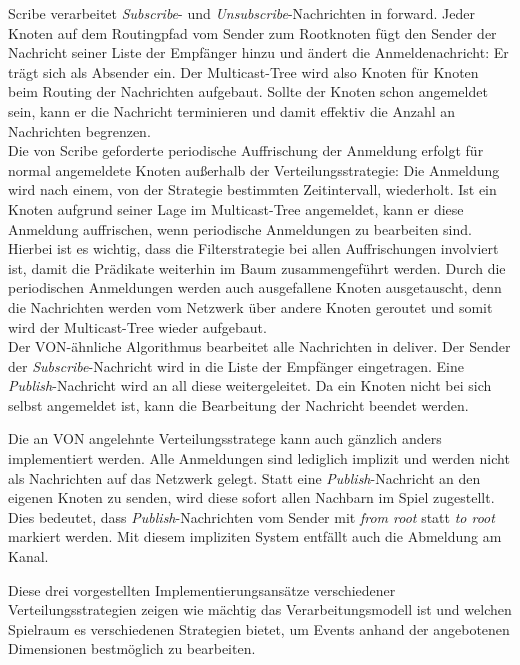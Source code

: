 Scribe verarbeitet \emph{Subscribe}- und \emph{Unsubscribe}-Nachrichten in forward. Jeder Knoten auf dem Routingpfad vom Sender zum Rootknoten fügt den Sender der Nachricht seiner Liste der Empfänger hinzu und ändert die Anmeldenachricht: Er trägt sich als Absender ein. Der Multicast-Tree wird also Knoten für Knoten beim Routing der Nachrichten aufgebaut. Sollte der Knoten schon angemeldet sein, kann er die Nachricht terminieren und damit effektiv die Anzahl an Nachrichten begrenzen.\\
Die von Scribe geforderte periodische Auffrischung der Anmeldung erfolgt für normal angemeldete Knoten außerhalb der Verteilungsstrategie: Die Anmeldung wird nach einem, von der Strategie bestimmten Zeitintervall, wiederholt. Ist ein Knoten aufgrund seiner Lage im Multicast-Tree angemeldet, kann er diese Anmeldung auffrischen, wenn periodische Anmeldungen zu bearbeiten sind. Hierbei ist es wichtig, dass die Filterstrategie bei allen Auffrischungen involviert ist, damit die Prädikate weiterhin im Baum zusammengeführt werden. Durch die periodischen Anmeldungen werden auch ausgefallene Knoten ausgetauscht, denn die Nachrichten werden vom Netzwerk über andere Knoten geroutet und somit wird der Multicast-Tree wieder aufgebaut.\\
Der VON-ähnliche Algorithmus bearbeitet alle Nachrichten in deliver. Der Sender der \emph{Subscribe}-Nachricht wird in die Liste der Empfänger eingetragen. Eine \emph{Publish}-Nachricht wird an all diese weitergeleitet. Da ein Knoten nicht bei sich selbst angemeldet ist, kann die Bearbeitung der Nachricht beendet werden.

Die an VON angelehnte Verteilungsstratege kann auch gänzlich anders implementiert werden. Alle Anmeldungen sind lediglich implizit und werden nicht als Nachrichten auf das Netzwerk gelegt. Statt eine \emph{Publish}-Nachricht an den eigenen Knoten zu senden, wird diese sofort allen Nachbarn im Spiel zugestellt. Dies bedeutet, dass \emph{Publish}-Nachrichten vom Sender mit \emph{from root} statt \emph{to root} markiert werden. Mit diesem impliziten System entfällt auch die Abmeldung am Kanal.

Diese drei vorgestellten Implementierungsansätze verschiedener Verteilungsstrategien zeigen wie mächtig das Verarbeitungsmodell ist und welchen Spielraum es verschiedenen Strategien bietet, um Events anhand der angebotenen Dimensionen bestmöglich zu bearbeiten.
